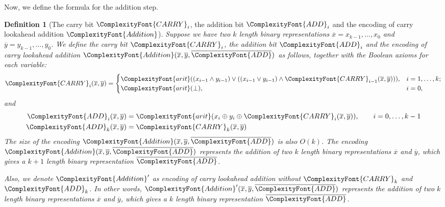 \documentclass[11pt,letter]{article}
\newtheorem{definition}[theorem]{Definition}
\theoremstyle{remark} %
\newcommand{\arit}{ %
    {
        \ComplexityFont{arit}
    }
}
\newcommand{\carry}{ %
    {
        \ComplexityFont{CARRY}
    }
}
\newcommand{\add}{ %
    {
        \ComplexityFont{ADD}
    }
}
\newcommand{\addition}{ %
    {
        \ComplexityFont{Addition}
    }
}
\begin{document}
{    Now, we define the formula for the addition step.
    
    \begin{definition}[The carry bit $\carry_i$, the addition bit $\add_i$ and the encoding of carry lookahead addition $\addition$] 
        \label{def: carry-add}
        Suppose we have two $k$ length binary representations $\overline{x}=x_{k-1},\dots,x_0$ and $\overline{y}=y_{k-1},\dots,y_0$. We define the carry bit $\carry_i$, the addition bit $\add_i$ and the encoding of carry lookahead addition $\addition(\overline{x},\overline{y},\overline{\add})$ as follows, together with the Boolean axioms for each variable:
        \begin{equation*}
            \carry_i(\overline{x},\overline{y}) = \begin{cases}
                \arit((x_{i-1}\land y_{i-1}) \lor ((x_{i-1}\lor y_{i-1})\land \carry_{i-1}(\overline{x},\overline{y}))), &i=1,\dots, k; \\
                \arit(\bot), &i=0,
            \end{cases}
        \end{equation*}
        and
        \begin{align*}
            \add_i(\overline{x},\overline{y}) &= \arit(x_i \oplus y_i \oplus \carry_i(\overline{x},\overline{y})), \qquad i=0,\dots, k-1\\
            \add_k(\overline{x},\overline{y}) &= \carry_k(\overline{x},\overline{y})
        \end{align*}
        The size of the encoding $\addition(\overline{x},\overline{y},\overline{\add})$ is also $O(k)$. The encoding $\addition(\overline{x},\overline{y},\overline{\add})$ represents the addition of two $k$ length binary representations $\overline{x}$ and $\overline{y}$, which gives a $k+1$ length binary representation $\overline{\add}$.
        
        Also, we denote $\addition^\prime$ as encoding of carry lookahead addition without $\carry_k$ and $\add_k$. In other words, $\addition^\prime(\overline{x},\overline{y},\overline{\add})$ represents the addition of two $k$ length binary representations $\overline{x}$ and $\overline{y}$, which gives a $k$ length binary representation $\overline{\add}$.
    \end{definition}
    
}
\end{document}
